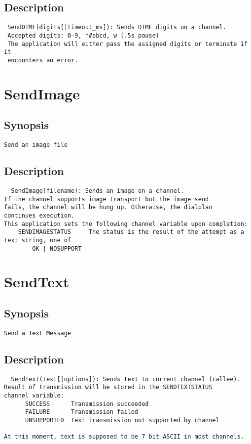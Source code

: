 \subsection{Description}
\begin{verbatim}
 SendDTMF(digits[|timeout_ms]): Sends DTMF digits on a channel. 
 Accepted digits: 0-9, *#abcd, w (.5s pause)
 The application will either pass the assigned digits or terminate if it
 encounters an error.

\end{verbatim}


\section{SendImage}
\subsection{Synopsis}
\begin{verbatim}
Send an image file
\end{verbatim}
\subsection{Description}
\begin{verbatim}
  SendImage(filename): Sends an image on a channel. 
If the channel supports image transport but the image send
fails, the channel will be hung up. Otherwise, the dialplan
continues execution.
This application sets the following channel variable upon completion:
	SENDIMAGESTATUS		The status is the result of the attempt as a text string, one of
		OK | NOSUPPORT 

\end{verbatim}


\section{SendText}
\subsection{Synopsis}
\begin{verbatim}
Send a Text Message
\end{verbatim}
\subsection{Description}
\begin{verbatim}
  SendText(text[|options]): Sends text to current channel (callee).
Result of transmission will be stored in the SENDTEXTSTATUS
channel variable:
      SUCCESS      Transmission succeeded
      FAILURE      Transmission failed
      UNSUPPORTED  Text transmission not supported by channel

At this moment, text is supposed to be 7 bit ASCII in most channels.

\end{verbatim}


